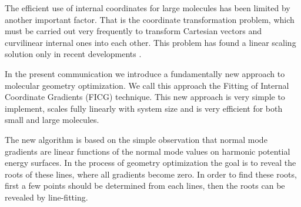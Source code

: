 \documentclass[prl,aps,twocolumn,showpacs,twocolumngrid,superbib]{revtex4}
\begin{document}
The efficient use of internal coordinates for large molecules has 
been limited by another important factor. That is the coordinate
transformation problem, which must be carried out very frequently
to transform Cartesian vectors and curvilinear internal ones into each
other. This problem has found a linear scaling solution   
only in recent developments 
\cite{paizs_coordtrf1,nemeth_coordtrf1,paizs_coordtrf2,nemeth_coordtrf2,billeter_coordtrf,andzelm_coordtrf,kudin_coordtrf}. 

In the present communication we introduce a fundamentally new approach
to molecular geometry optimization. We call this approach the
Fitting of Internal Coordinate Gradients
(FICG) technique. This new approach is very simple
to implement, scales fully linearly with system size 
and is very efficient for both small and large molecules.

The new algorithm is based on the simple observation that
normal mode gradients are linear functions of the normal mode values 
on harmonic potential energy surfaces. 
In the process of geometry optimization the goal is to reveal the roots
of these lines, where all gradients become zero. In order to 
find these roots, first a few points should be determined from each
lines, then the roots can be revealed by line-fitting. 
\end{document}
